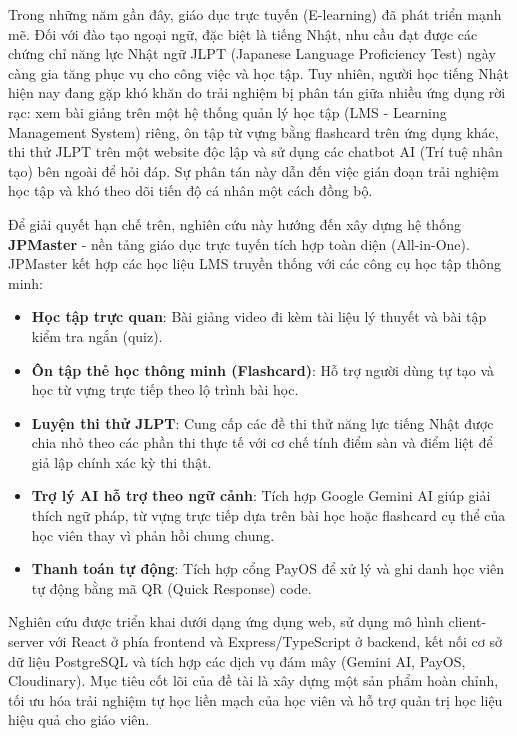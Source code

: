 \documentclass[../DoAn.tex]{subfiles}
\begin{document}
Trong những năm gần đây, giáo dục trực tuyến (E-learning) đã phát triển mạnh mẽ. Đối với đào tạo ngoại ngữ, đặc biệt là tiếng Nhật, nhu cầu đạt được các chứng chỉ năng lực Nhật ngữ JLPT (Japanese Language Proficiency Test) ngày càng gia tăng phục vụ cho công việc và học tập. Tuy nhiên, người học tiếng Nhật hiện nay đang gặp khó khăn do trải nghiệm bị phân tán giữa nhiều ứng dụng rời rạc: xem bài giảng trên một hệ thống quản lý học tập (LMS - Learning Management System) riêng, ôn tập từ vựng bằng flashcard trên ứng dụng khác, thi thử JLPT trên một website độc lập và sử dụng các chatbot AI (Trí tuệ nhân tạo) bên ngoài để hỏi đáp. Sự phân tán này dẫn đến việc gián đoạn trải nghiệm học tập và khó theo dõi tiến độ cá nhân một cách đồng bộ.

Để giải quyết hạn chế trên, nghiên cứu này hướng đến xây dựng hệ thống \textbf{JPMaster} - nền tảng giáo dục trực tuyến tích hợp toàn diện (All-in-One). JPMaster kết hợp các học liệu LMS truyền thống với các công cụ học tập thông minh:
\begin{itemize}
    \item \textbf{Học tập trực quan}: Bài giảng video đi kèm tài liệu lý thuyết và bài tập kiểm tra ngắn (quiz).
    \item \textbf{Ôn tập thẻ học thông minh (Flashcard)}: Hỗ trợ người dùng tự tạo và học từ vựng trực tiếp theo lộ trình bài học.
    \item \textbf{Luyện thi thử JLPT}: Cung cấp các đề thi thử năng lực tiếng Nhật được chia nhỏ theo các phần thi thực tế với cơ chế tính điểm sàn và điểm liệt để giả lập chính xác kỳ thi thật.
    \item \textbf{Trợ lý AI hỗ trợ theo ngữ cảnh}: Tích hợp Google Gemini AI giúp giải thích ngữ pháp, từ vựng trực tiếp dựa trên bài học hoặc flashcard cụ thể của học viên thay vì phản hồi chung chung.
    \item \textbf{Thanh toán tự động}: Tích hợp cổng PayOS để xử lý và ghi danh học viên tự động bằng mã QR (Quick Response) code.
\end{itemize}

Nghiên cứu được triển khai dưới dạng ứng dụng web, sử dụng mô hình client-server với React ở phía frontend và Express/TypeScript ở backend, kết nối cơ sở dữ liệu PostgreSQL và tích hợp các dịch vụ đám mây (Gemini AI, PayOS, Cloudinary). Mục tiêu cốt lõi của đề tài là xây dựng một sản phẩm hoàn chỉnh, tối ưu hóa trải nghiệm tự học liền mạch của học viên và hỗ trợ quản trị học liệu hiệu quả cho giáo viên.
\end{document}
